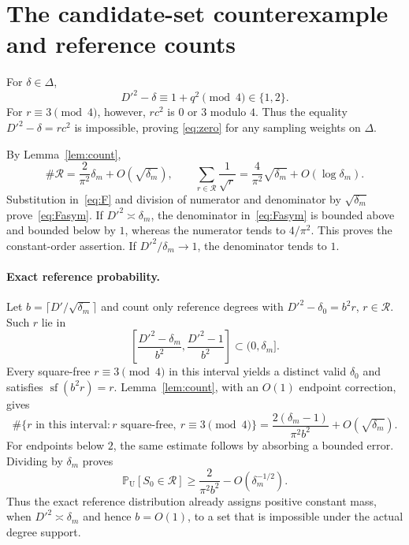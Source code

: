 \documentclass[a4paper,11pt]{article}
\theoremstyle{remark}
\DeclareMathOperator{\sfpart}{sf}
\newcommand{\Rset}{\mathcal R}
\newcommand{\PrU}{\mathbb P_{\mathrm U}}
\begin{document}
\section{The candidate-set counterexample and reference counts}
\label{app:counter}

For $\delta\in\Delta$,
\[
 D'^2-\delta\equiv1+q^2\pmod4\in\{1,2\}.
\]
For $r\equiv3\pmod4$, however, $rc^2$ is $0$ or $3$ modulo $4$.
Thus the equality $D'^2-\delta=rc^2$ is impossible, proving
\eqref{eq:zero} for any sampling weights on $\Delta$.

By Lemma~\ref{lem:count},
\[
 \#\Rset=\frac2{\pi^2}\delta_m+O(\sqrt{\delta_m}),
 \qquad
 \sum_{r\in\Rset}\frac1{\sqrt r}
 =\frac4{\pi^2}\sqrt{\delta_m}+O(\log\delta_m).
\]
Substitution in~\eqref{eq:F} and division of numerator and denominator
by $\sqrt{\delta_m}$ prove~\eqref{eq:Fasym}.
If $D'^2\asymp\delta_m$, the denominator in~\eqref{eq:Fasym} is
bounded above and bounded below by $1$, whereas the numerator tends to
$4/\pi^2$. This proves the constant-order assertion.
If $D'^2/\delta_m\to1$, the denominator tends to $1$.

\paragraph{Exact reference probability.}
Let $b=\lceil D'/\sqrt{\delta_m}\rceil$ and count only reference degrees with
$D'^2-\delta_0=b^2r$, $r\in\Rset$. Such $r$ lie in
\[
 \left[\frac{D'^2-\delta_m}{b^2},
       \frac{D'^2-1}{b^2}\right]\subset(0,\delta_m].
\]
Every square-free $r\equiv3\pmod4$ in this interval yields a distinct
valid $\delta_0$ and satisfies $\sfpart(b^2r)=r$.
Lemma~\ref{lem:count}, with an $O(1)$ endpoint correction, gives
\[
 \#\{r\text{ in this interval}:r\text{ square-free},\
                              r\equiv3\pmod4\}
 =\frac{2(\delta_m-1)}{\pi^2b^2}+O(\sqrt{\delta_m}).
\]
For endpoints below $2$, the same estimate follows by absorbing a bounded
error. Dividing by $\delta_m$ proves
\begin{equation}\label{eq:exactreference}
 \PrU[S_0\in\Rset]\ge
 \frac2{\pi^2b^2}-O(\delta_m^{-1/2}).
\end{equation}
Thus the exact reference distribution already assigns positive constant
mass, when $D'^2\asymp\delta_m$ and hence $b=O(1)$, to a set that is
impossible under the actual degree support.
\end{document}
